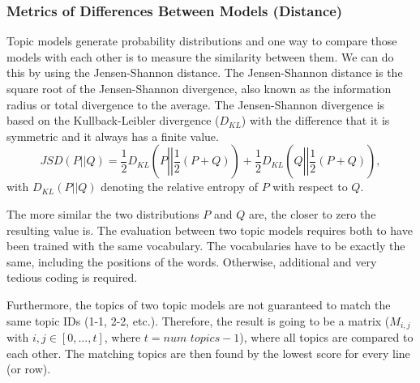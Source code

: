 \subsubsection{Metrics of Differences Between Models (Distance)}\label{sec:diffmet}
Topic models generate probability distributions and one way to compare those models with each other is to measure the similarity between them. We can do this by using the Jensen-Shannon distance. The Jensen-Shannon distance is the square root of the Jensen-Shannon divergence, also known as the information radius or total divergence to the average. The Jensen-Shannon divergence \cite{fuglede2004jensen} is based on the Kullback-Leibler divergence ($D_{KL}$) with the difference that it is symmetric and it always has a finite value. 
\begin{equation}
    JSD(P||Q)=\frac{1}{2}D_{KL}\left(P\left|\left|\frac{1}{2}(P+Q)\right.\right.\right)+\frac{1}{2}D_{KL}\left(Q\left|\left|\frac{1}{2}(P+Q)\right.\right.\right),
\end{equation}
with $D_{KL}(P||Q)$ denoting the relative entropy of $P$ with respect to $Q$.

The more similar the two distributions $P$ and $Q$ are, the closer to zero the resulting value is. The evaluation between two topic models requires both to have been trained with the same vocabulary. The vocabularies have to be exactly the same, including the positions of the words. Otherwise, additional and very tedious coding is required.

Furthermore, the topics of two topic models are not guaranteed to match the same topic IDs (1-1, 2-2, etc.). Therefore, the result is going to be a matrix ($M_{i,j}$ with $i,j\in[0,...,t]$, where $t=\textit{num topics}-1$), where all topics are compared to each other. The matching topics are then found by the lowest score for every line (or row). 